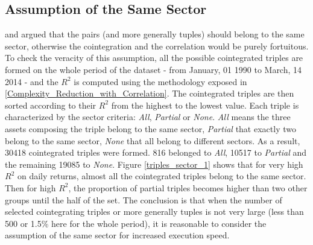 \documentclass[11pt,a4,twosided,singlespacing,titlepagenumber=on]{scrreprt}
\numberwithin{equation}{chapter} %
\theoremstyle{remark}
\begin{document}
\subsection{Assumption of the Same Sector}
\cite{chan2009} and \cite{dunis2010} argued that the pairs (and more generally tuples) should belong to the same sector, otherwise the cointegration and the correlation would be purely fortuitous. To check the veracity of this assumption, all the possible cointegrated triples are formed on the whole period of the dataset  - from January, 01 1990 to March, 14 2014 - and the $R^2$ is computed using the methodology exposed in \ref{Complexity_Reduction_with_Correlation}. The cointegrated triples are then sorted according to their $R^2$ from the highest to the lowest value. Each triple is characterized by the sector criteria: \textit{All}, \textit{Partial} or \textit{None}. \textit{All} means the three assets composing the triple belong to the same sector, \textit{Partial} that exactly two belong to the same sector, \textit{None} that all belong to different sectors. As a result, 30418 cointegrated triples were formed. 816 belonged to \textit{All}, 10517 to \textit{Partial} and the remaining 19085 to \textit{None}. Figure \ref{triples_sector_1} shows that for very high $R^2$ on daily returns, almost all the cointegrated triples belong to the same sector. Then for high $R^2$, the proportion of partial triples becomes higher than two other groups until the half of the set. The conclusion is that when the number of selected cointegrating triples or more generally tuples is not very large (less than 500 or 1.5\% here for the whole period), it is reasonable to consider the assumption of the same sector for increased execution speed.
\end{document}
